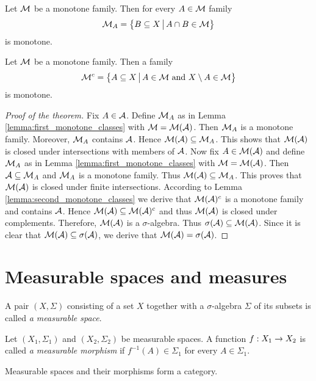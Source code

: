 \begin{lemma}\label{lemma:first_monotone_classes}
Let ${\mathcal M}$ be a monotone family. Then for every $A \in {\mathcal M}$ family
$${\mathcal M}_A = \big\{B\subseteq X\,\big|\,A\cap B\in {\mathcal M}\big\}$$
is monotone.
\end{lemma}

\begin{lemma}\label{lemma:second_monotone_classes}
Let ${\mathcal M}$ be a monotone family. Then a family
$${\mathcal M}^c= \big\{A \subseteq X \,\big|\,A\in {\mathcal M}\mbox{ and }X\setminus A\in {\mathcal M}\big\}$$
is monotone.
\end{lemma}

\begin{proof}[Proof of the theorem]
Fix $A\in {\mathcal A}$. Define ${\mathcal M}_A$ as in Lemma \ref{lemma:first_monotone_classes} with ${\mathcal M} = {\mathcal M}({\mathcal A})$. Then ${\mathcal M}_A$ is a monotone family. Moreover, ${\mathcal M}_A$ contains ${\mathcal A}$. Hence ${\mathcal M}({\mathcal A})\subseteq {\mathcal M}_A$. This shows that ${\mathcal M}({\mathcal A})$ is closed under intersections with members of ${\mathcal A}$. Now fix $A\in {\mathcal M}({\mathcal A})$ and define ${\mathcal M}_A$ as in Lemma \ref{lemma:first_monotone_classes} with ${\mathcal M} = {\mathcal M}({\mathcal A})$. Then ${\mathcal A} \subseteq {\mathcal M}_A$ and ${\mathcal M}_A$ is a monotone family. Thus ${\mathcal M}({\mathcal A})\subseteq {\mathcal M}_A$. This proves that ${\mathcal M}({\mathcal A})$ is closed under finite intersections. According to Lemma \ref{lemma:second_monotone_classes} we derive that ${\mathcal M}({\mathcal A})^c$ is a monotone family and contains ${\mathcal A}$. Hence ${\mathcal M}({\mathcal A})\subseteq {\mathcal M}({\mathcal A})^c$ and thus ${\mathcal M}({\mathcal A})$ is closed under complements. Therefore, ${\mathcal M}({\mathcal A})$ is a $\sigma$-algebra. Thus $\sigma({\mathcal A})\subseteq {\mathcal M}({\mathcal A})$. Since it is clear that ${\mathcal M}({\mathcal A}) \subseteq \sigma({\mathcal A})$, we derive that ${\mathcal M}({\mathcal A}) = \sigma({\mathcal A})$.
\end{proof}

\section{Measurable spaces and measures}

\begin{definition}
A pair $(X,\Sigma)$ consisting of a set $X$ together with a $\sigma$-algebra $\Sigma$ of its subsets is called \textit{a measurable space}.
\end{definition}

\begin{definition}
Let $(X_1,\Sigma_1)$ and $(X_2,\Sigma_2)$ be measurable spaces. A function $f:X_1\rightarrow X_2$ is called \textit{a measurable morphism} if $f^{-1}(A)\in \Sigma_1$ for every $A\in \Sigma_1$.
\end{definition}
\noindent
Measurable spaces and their morphisms form a category. 

